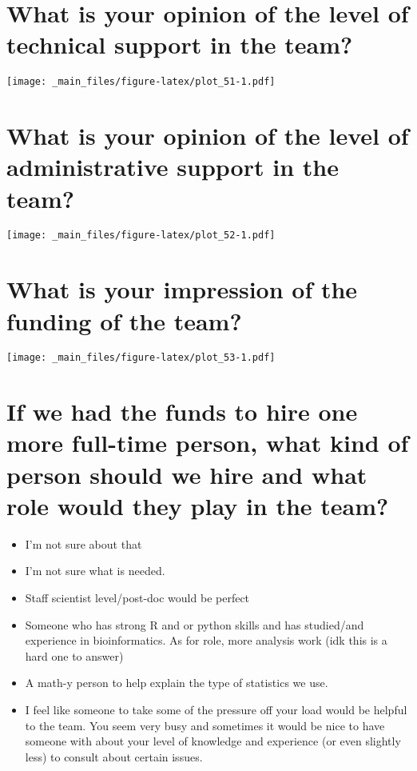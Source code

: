 \documentclass[
]{book}
\providecommand{\tightlist}{%
  \setlength{\itemsep}{0pt}\setlength{\parskip}{0pt}}
\begin{document}
\hypertarget{what-is-your-opinion-of-the-level-of-technical-support-in-the-team}{%
\section{What is your opinion of the level of technical support in the team?}\label{what-is-your-opinion-of-the-level-of-technical-support-in-the-team}}

\texttt{[image: \_main\_files/figure-latex/plot\_51-1.pdf]}

\hypertarget{what-is-your-opinion-of-the-level-of-administrative-support-in-the-team}{%
\section{What is your opinion of the level of administrative support in the team?}\label{what-is-your-opinion-of-the-level-of-administrative-support-in-the-team}}

\texttt{[image: \_main\_files/figure-latex/plot\_52-1.pdf]}

\hypertarget{what-is-your-impression-of-the-funding-of-the-team}{%
\section{What is your impression of the funding of the team?}\label{what-is-your-impression-of-the-funding-of-the-team}}

\texttt{[image: \_main\_files/figure-latex/plot\_53-1.pdf]}

\hypertarget{if-we-had-the-funds-to-hire-one-more-full-time-person-what-kind-of-person-should-we-hire-and-what-role-would-they-play-in-the-team}{%
\section{If we had the funds to hire one more full-time person, what kind of person should we hire and what role would they play in the team?}\label{if-we-had-the-funds-to-hire-one-more-full-time-person-what-kind-of-person-should-we-hire-and-what-role-would-they-play-in-the-team}}

\begin{itemize}
\tightlist
\item
  I'm not sure about that
\item
  I'm not sure what is needed.
\item
  Staff scientist level/post-doc would be perfect
\item
  Someone who has strong R and or python skills and has studied/and experience in bioinformatics. As for role, more analysis work (idk this is a hard one to answer)
\item
  A math-y person to help explain the type of statistics we use.
\item
  I feel like someone to take some of the pressure off your load would be helpful to the team. You seem very busy and sometimes it would be nice to have someone with about your level of knowledge and experience (or even slightly less) to consult about certain issues.
\end{itemize}
\end{document}
